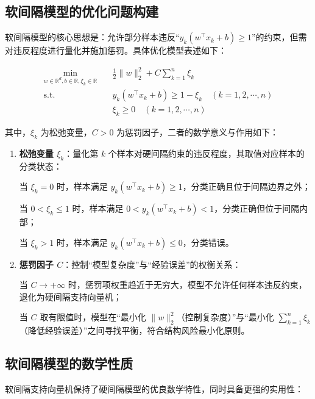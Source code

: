 \documentclass{article}
\newenvironment{solution_cn}{%
  \begin{proof}[解答]%
}{%
  \end{proof}%
}
\begin{document}
\begin{solution_cn}
\subsection{软间隔模型的优化问题构建}

软间隔模型的核心思想是：允许部分样本违反“$ y_k (w^\top x_k + b) \geq 1 $”的约束，但需对违反程度进行量化并施加惩罚。具体优化模型表述如下：

\begin{equation}
\begin{split}
\min_{w \in \mathbb{R}^d, b \in \mathbb{R}, \xi_k \in \mathbb{R}} \quad & \frac{1}{2} \|w\|_2^2 + C \sum_{k=1}^n \xi_k \\
\text{s.t.} \quad & y_k (w^\top x_k + b) \geq 1 - \xi_k \quad (k = 1,2,\cdots,n) \\
& \xi_k \geq 0 \quad (k = 1,2,\cdots,n)
\end{split}
\end{equation}

其中，$ \xi_k $ 为松弛变量，$ C > 0 $ 为惩罚因子，二者的数学意义与作用如下：

\begin{enumerate}
\item \textbf{松弛变量 $ \xi_k $}：量化第 $ k $ 个样本对硬间隔约束的违反程度，其取值对应样本的分类状态：

当 $ \xi_k = 0 $ 时，样本满足 $ y_k (w^\top x_k + b) \geq 1 $，分类正确且位于间隔边界之外；
   
当 $ 0 < \xi_k \leq 1 $ 时，样本满足 $ 0 < y_k (w^\top x_k + b) < 1 $，分类正确但位于间隔内部；
   
当 $ \xi_k > 1 $ 时，样本满足 $ y_k (w^\top x_k + b) \leq 0 $，分类错误。

\item \textbf{惩罚因子 $ C $}：控制“模型复杂度”与“经验误差”的权衡关系：

当 $ C \to +\infty $ 时，惩罚项权重趋近于无穷大，模型不允许任何样本违反约束，退化为硬间隔支持向量机；

当 $ C $ 取有限值时，模型在“最小化 $ \|w\|_2^2 $（控制复杂度）”与“最小化 $ \sum_{k=1}^n \xi_k $（降低经验误差）”之间寻找平衡，符合结构风险最小化原则。

\end{enumerate}

\subsection{软间隔模型的数学性质}

软间隔支持向量机保持了硬间隔模型的优良数学特性，同时具备更强的实用性：


\end{solution_cn}
\end{document}
